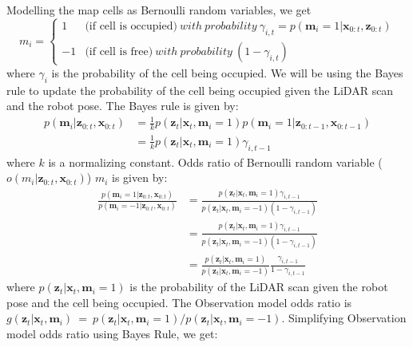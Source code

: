 \documentclass[a4paper]{article}
\begin{document}
Modelling the map cells as Bernoulli random variables, we get
\begin{equation}
    m_i = \begin{cases}
    1 & \text{(if cell is occupied)} \ with \ probability \ \gamma_{i,t} = p( \mathbf{m}_i = 1| \mathbf{x}_{0:t}, \mathbf{z}_{0:t}) \\
    -1 & \text{(if cell is free)} \ with \ probability \ (1-\gamma_{i,t})
    \end{cases}
\end{equation}
where $\gamma_i$ is the probability of the cell being occupied. We will be using the Bayes rule to update the probability of the cell being occupied given the LiDAR scan and the robot pose. The Bayes rule is given by:
\begin{equation}
\begin{aligned}
    p(\mathbf{m}_i| \mathbf{z}_{0:t}, \mathbf{x}_{0:t}) &= \frac{1}{k}p(\mathbf{z}_{t} | \mathbf{x}_{t}, \mathbf{m}_i = 1) p(\mathbf{m}_i = 1 | \mathbf{z}_{0:t-1}, \mathbf{x}_{0:t-1}) \\
    &= \frac{1}{k}p(\mathbf{z}_{t} | \mathbf{x}_{t}, \mathbf{m}_i = 1) \gamma_{i,t-1}
\end{aligned}
\end{equation}
where $k$ is a normalizing constant. Odds ratio of Bernoulli random variable ($o(m_i | \mathbf{z}_{0:t}, \mathbf{x}_{0:t})$) $m_i$ is given by:
\begin{equation}
\begin{aligned}
    \frac{p(\mathbf{m}_i = 1 | \mathbf{z}_{0:t}, \mathbf{x}_{0:t})}{p(\mathbf{m}_i = -1 | \mathbf{z}_{0:t}, \mathbf{x}_{0:t})} &= \frac{p(\mathbf{z}_{t} | \mathbf{x}_{t}, \mathbf{m}_i = 1) \gamma_{i,t-1}}{p(\mathbf{z}_{t} | \mathbf{x}_{t}, \mathbf{m}_i = -1) (1-\gamma_{i,t-1})} \\
    &= \frac{p(\mathbf{z}_{t} | \mathbf{x}_{t}, \mathbf{m}_i = 1) \gamma_{i,t-1}}{p(\mathbf{z}_{t} | \mathbf{x}_{t}, \mathbf{m}_i = -1) (1-\gamma_{i,t-1})} \\
    &= \frac{p(\mathbf{z}_{t} | \mathbf{x}_{t}, \mathbf{m}_i = 1)}{p(\mathbf{z}_{t} | \mathbf{x}_{t}, \mathbf{m}_i = -1)} \frac{\gamma_{i,t-1}}{1-\gamma_{i,t-1}}
\end{aligned}
\end{equation}
where $p(\mathbf{z}_{t} | \mathbf{x}_{t}, \mathbf{m}_i = 1)$ is the probability of the LiDAR scan given the robot pose and the cell being occupied. The Observation model odds ratio is $g(\mathbf{z}_{t} | \mathbf{x}_{t}, \mathbf{m}_i) \ = \ p(\mathbf{z}_{t} | \mathbf{x}_{t}, \mathbf{m}_i = 1) / p(\mathbf{z}_{t} | \mathbf{x}_{t}, \mathbf{m}_i = -1)$. Simplifying Observation model odds ratio using Bayes Rule, we get:
\end{document}
